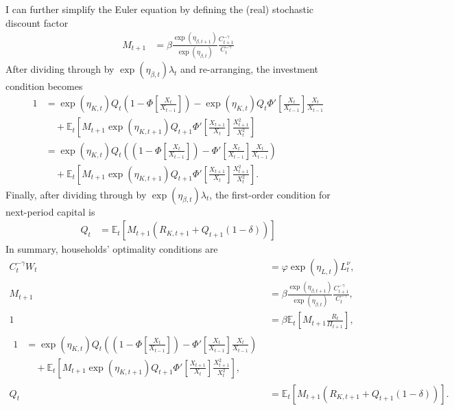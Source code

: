 \documentclass[12 pt, oneside]{article}
\theoremstyle{definition}
\theoremstyle{definition}
\theoremstyle{definition}
\newcommand{\E}{\mathbb{E}}
\begin{document}
I can further simplify the Euler equation by defining the (real) stochastic discount factor
\begin{align*}
  M_{t + 1} & = \beta\frac{\exp(\eta_{\beta, t + 1})}{\exp(\eta_{\beta, t})}\frac{C_{t + 1}^{-\gamma}}{C_t^{-\gamma}}
\end{align*}
After dividing through by $\exp(\eta_{\beta, t})\lambda_t$ and re-arranging, the investment condition becomes
\begin{align*}
  1 & = \exp(\eta_{K, t}) Q_t \left(1 - \Phi\left[\frac{X_t}{X_{t - 1}}\right]\right) - \exp(\eta_{K, t})Q_t\Phi'\left[\frac{X_t}{X_{t - 1}}\right]\frac{X_t}{X_{t - 1}}\\
    &\quad + \E_t\left[M_{t + 1}\exp(\eta_{K, t + 1})Q_{t + 1} \Phi'\left[\frac{X_{t + 1}}{X_t}\right]\frac{X_{t + 1}^2}{X_t^2}\right]\\
    & =  \exp(\eta_{K, t}) Q_t \left(\left(1 - \Phi\left[\frac{X_t}{X_{t - 1}}\right]\right) - \Phi'\left[\frac{X_t}{X_{t - 1}}\right]\frac{X_t}{X_{t - 1}}\right) \\
    &\quad + \E_t\left[M_{t + 1}\exp(\eta_{K, t + 1})Q_{t + 1} \Phi'\left[\frac{X_{t + 1}}{X_t}\right]\frac{X_{t + 1}^2}{X_t^2}\right].
\end{align*}
Finally, after dividing through by $\exp(\eta_{\beta, t})\lambda_t$, the first-order condition for next-period capital is
\begin{align*}
  Q_t & = \E_t[M_{t + 1} (R_{K, t + 1} + Q_{t + 1}(1  - \delta))]
\end{align*}
In summary, households' optimality conditions are
\begin{align}
  \label{eq:consumption labor}
    C_t^{-\gamma} W_t & = \varphi\exp(\eta_{L, t}) L_t^\nu,\\
  \label{eq:stochastic discount factor}
  M_{t + 1} & = \beta\frac{\exp(\eta_{\beta, t + 1})}{\exp(\eta_{\beta, t})}\frac{C_{t + 1}^{-\gamma}}{C_t^{-\gamma}},\\
  \label{eq:euler eqn}
  1 & = \beta \E_t\left[M_{t + 1}\frac{R_t}{\Pi_{t + 1}}\right],\\
  \label{eq:tobins q}
  \begin{split}
    1  & =  \exp(\eta_{K, t}) Q_t \left(\left(1 - \Phi\left[\frac{X_t}{X_{t - 1}}\right]\right) - \Phi'\left[\frac{X_t}{X_{t - 1}}\right]\frac{X_t}{X_{t - 1}}\right) \\
    &\quad + \E_t\left[M_{t + 1}\exp(\eta_{K, t + 1})Q_{t + 1} \Phi'\left[\frac{X_{t + 1}}{X_t}\right]\frac{X_{t + 1}^2}{X_t^2}\right],
  \end{split}\\
  \label{eq:capital asset pricing}
  Q_t & = \E_t[M_{t + 1} (R_{K, t + 1} + Q_{t + 1}(1  - \delta))].
\end{align}
\end{document}
